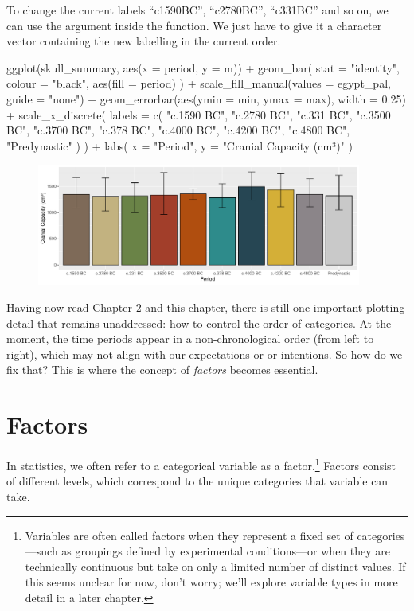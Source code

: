 To change the current labels ``c1590BC'', ``c2780BC'', ``c331BC'' and so on, we can use the  argument inside the  function. We just have to give it a character vector containing the new labelling in the current order.

\begin{inR}
ggplot(skull_summary, aes(x = period, y = m)) +
  geom_bar(
    stat = "identity",
    colour = "black",
    aes(fill = period)
  ) +
  scale_fill_manual(values = egypt_pal, guide = "none") +
  geom_errorbar(aes(ymin = min, ymax = max), width = 0.25) +
  scale_x_discrete(
    labels = c(
      "c.1590 BC", "c.2780 BC", "c.331 BC", "c.3500 BC", "c.3700 BC",
      "c.378 BC", "c.4000 BC", "c.4200 BC", "c.4800 BC", "Predynastic"
    )
  ) +
  labs(
    x = "Period",
    y = "Cranial Capacity (cm³)"
  )
\end{inR}

\vspace{2em}

\begin{figure}[H]
\includegraphics[width = 0.95\textwidth]{graphics/ch3Figs/bar_5.pdf}
\end{figure}

Having now read Chapter 2 and this chapter, there is still one important plotting detail that remains unaddressed: how to control the order of categories. At the moment, the time periods appear in a non-chronological order (from left to right), which may not align with our expectations or or intentions. So how do we fix that? This is where the concept of \textit{factors} becomes essential.

\section{Factors}

In statistics, we often refer to a categorical variable as a \gls{factor}.\footnote{Variables are often called factors when they represent a fixed set of categories—such as groupings defined by experimental conditions—or when they are technically continuous but take on only a limited number of distinct values. If this seems unclear for now, don’t worry; we’ll explore variable types in more detail in a later chapter.} Factors consist of different \glspl{level}, which correspond to the unique categories that variable can take.

